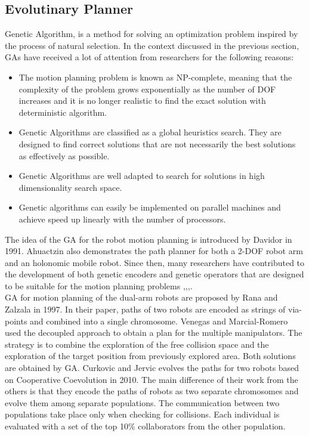 \documentclass[12pt]{article} %
\begin{document}
\subsection{Evolutinary Planner}
Genetic Algorithm\cite{Holland},\cite{David} is a method for solving an optimization problem inspired by the process of natural selection. In the context discussed in the previous section, GAs have received a lot of attention from researchers for the following reasons:

\begin{itemize}
\item The motion planning problem is known as NP-complete\cite{Canny}, meaning that the complexity of the problem grows exponentially as the number of DOF increases and it is no longer realistic to find the exact solution with deterministic algorithm.
\item Genetic Algorithms are classified as a global heuristics search. They are designed to find correct solutions that are not necessarily the best solutions as effectively as possible. 
\item Genetic Algorithms are well adapted to search for solutions in high dimensionality search space.
\item Genetic algorithms can easily be implemented on parallel machines and achieve speed up linearly with the number of processors.
\end{itemize}

The idea of the GA for the robot motion planning is introduced by Davidor\cite{Davidor} in 1991. Ahuactzin\cite{Ahuactzin} also demonstrates the path planner for both a 2-DOF robot arm and an holonomic mobile robot. Since then, many researchers have contributed to the development of both genetic encoders and genetic operators that are designed to be suitable for the motion planning problems \cite{Tian},\cite{Kazem},\cite{Macros},\cite{Macros2}.\\

GA for motion planning of the dual-arm robots are proposed by Rana and Zalzala\cite{Rana} in 1997. In their paper, paths of two robots are encoded as strings of via-points and combined into a single chromosome. Venegas and Marcial-Romero\cite{Venegas} used the decoupled approach to obtain a plan for the multiple manipulators. The strategy is to combine the exploration of the free collision space and the exploration of the target position from previously explored area. Both solutions are obtained by GA. Curkovic and Jervic\cite{Curkovic} evolves the paths for two robots based on Cooperative Coevolution in 2010. The main difference of their work from the others is that they encode the paths of robots as two separate chromosomes and evolve them among separate populations. The communication between two populations take place only when checking for collisions. Each individual is evaluated with a set of the top 10\% collaborators from the other population.
\end{document}
